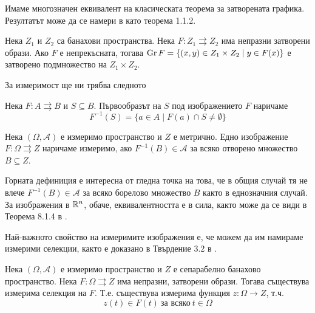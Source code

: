 Имаме многозначен еквивалент на класическата теорема за затворената графика. Резултатът може да се намери в \cite{DeimlingMulti} като теорема 1.1.2.
\begin{theorem}\label{ClosedGraph}
    Нека $Z_1$ и $Z_2$ са банахови пространства. Нека $F:Z_1\rightrightarrows Z_2$ има непразни затворени образи. Ако $F$ е непрекъсната, тогава $\operatorname{Gr} F = \{(x,y)\in Z_1\times Z_2 \mid y\in F(x)\}$ е затворено подмножество на $Z_1\times Z_2$.
\end{theorem}

За измеримост ще ни трябва следното
\begin{definition}
    Нека $F:A\rightrightarrows B$ и $S\subseteq B$. Първообразът на $S$ под изображението $F$ наричаме
    \[
        F^{-1}(S) = \{a\in A \mid F(a)\cap S \neq \emptyset\}
    \]
\end{definition}

\begin{definition}
    Нека $(\Omega, \mathcal{A})$ е измеримо пространство и $Z$ е метрично. Едно изображение $F:\Omega \rightrightarrows Z$ наричаме измеримо, ако $F^{-1}(B)\in\mathcal{A}$ за всяко отворено множество $B\subseteq Z$.
\end{definition}

Горната дефиниция е интересна от гледна точка на това, че в общия случай тя не влече $F^{-1}(B)\in\mathcal{A}$ за всяко борелово множество $B$ както в еднозначния случай. За изображения в $\mathbb{R}^n$, обаче, еквивалентността е в сила, както може да се види в Теорема 8.1.4 в \cite{SetValued}.

Най-важното свойство на измеримите изображения е, че можем да им намираме измерими селекции, както е доказано в Твърдение 3.2 в \cite{DeimlingMulti}.

\begin{theorem}
    Нека $(\Omega, \mathcal{A})$ е измеримо пространство и $Z$ е сепарабелно банахово пространство. Нека $F:\Omega\rightrightarrows Z$ има непразни, затворени образи. Тогава съществува измерима селекция на $F$. Т.е. съществува измерима функция $z:\Omega\to Z$, т.ч.
    \[
        z(t)\in F(t)\ \text{за всяко}\ t\in\Omega
    \]
\end{theorem}

